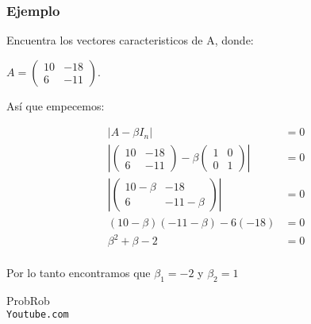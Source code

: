 \documentclass[12pt]{report}                                    %
\begin{document}
            \clearpage
            \subsubsection{Ejemplo}
            Encuentra los vectores caracteristicos de A, donde:

            $A = \begin{pmatrix}10&-18\\6&-11\end{pmatrix}$.

            Así que empecemos:

            \begin{equation*}
            \begin{split}
                \left|A - \beta I_n \right| &= 0 \\
                \left|\begin{pmatrix}10&-18\\6&-11\end{pmatrix} - \beta \begin{pmatrix}1&0\\0&1\end{pmatrix}\right| &= 0 \\
                \left|\begin{pmatrix}10 -\beta&-18\\6&-11-\beta\end{pmatrix} \right| &= 0 \\
                (10-\beta)(-11 -\beta) -6(-18)  &= 0 \\
                \beta^2 + \beta -2 &= 0 \\
            \end{split}
            \end{equation*}

            Por lo tanto encontramos que $\beta_1 = -2 $ y $ \beta_2 = 1$


        
        


\clearpage

    \begin{thebibliography}{9}

        ProbRob
        \\\texttt{Youtube.com}


     

\end{thebibliography}
\end{document}
